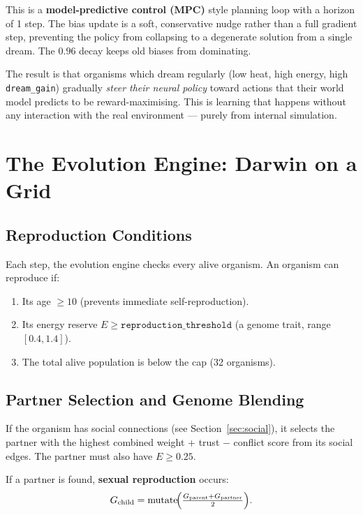 \documentclass[12pt,a4paper]{article}
\begin{document}
This is a \textbf{model-predictive control (MPC)} style planning
loop with a horizon of 1 step.
The bias update is a soft, conservative nudge rather than a
full gradient step, preventing the policy from collapsing
to a degenerate solution from a single dream.
The $0.96$ decay keeps old biases from dominating.

The result is that organisms which dream regularly (low heat,
high energy, high \texttt{dream\_gain}) gradually
\emph{steer their neural policy} toward actions that their
world model predicts to be reward-maximising.
This is learning that happens without any interaction
with the real environment — purely from internal simulation.

\section{The Evolution Engine: Darwin on a Grid}

\subsection{Reproduction Conditions}

Each step, the evolution engine checks every alive organism.
An organism can reproduce if:
\begin{enumerate}[nosep]
  \item Its age $\geq 10$ (prevents immediate self-reproduction).
  \item Its energy reserve $E \geq \texttt{reproduction\_threshold}$
    (a genome trait, range $[0.4, 1.4]$).
  \item The total alive population is below the cap (32 organisms).
\end{enumerate}

\subsection{Partner Selection and Genome Blending}

If the organism has social connections (see Section~\ref{sec:social}),
it selects the partner with the highest combined
weight + trust $-$ conflict score from its social edges.
The partner must also have $E \geq 0.25$.

If a partner is found, \textbf{sexual reproduction} occurs:
\[
  G_\text{child} = \text{mutate}\!\Bigl(\tfrac{G_\text{parent} + G_\text{partner}}{2}\Bigr).
\]
\end{document}
